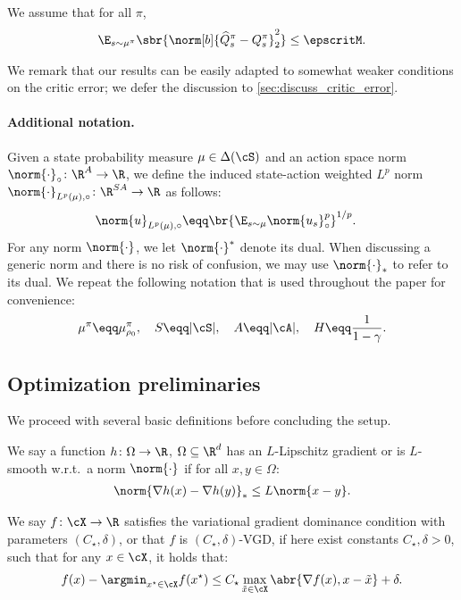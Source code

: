 \begin{assumption}
\label{assm:Q_oracle}
    We assume that for all $\pi$, 
    \begin{align*}
        \E_{s \sim \mu^\pi}\sbr{\norm[b]{\widehat Q_{s}^\pi - Q_{s}^\pi}_2^2} \leq \epscritM.
    \end{align*}
\end{assumption}
    We remark that our results can be easily adapted to 
    somewhat weaker conditions on the critic error; we defer the discussion to \cref{sec:discuss_critic_error}.
    
\paragraph{Additional notation.}
Given a state probability measure $\mu\in \Delta(\cS)$ and an action space norm $\norm{\cdot}_\circ\colon \R^A \to \R$, we define the induced state-action weighted $L^p$ norm $\norm{\cdot}_{L^p(\mu), \circ}\colon \R^{SA}\to \R$ as follows:
\begin{align*}
	\norm{u}_{L^p(\mu), \circ}
	&\eqq \br{\E_{s \sim \mu}\norm{u_s}_\circ^p}^{1/p}.
\end{align*}
For any norm $\norm{\cdot}$, we let $\norm{\cdot}^*$ denote its dual. When discussing a generic norm and there is no risk of confusion, we may use $\norm{\cdot}_*$ to refer to its dual.
We repeat the following notation that is used throughout the paper for convenience:
\begin{align*}
    \mu^\pi \eqq \mu^\pi_{\rho_0}, \quad 
    S \eqq |\cS|, \quad
    A \eqq |\cA|, \quad
    H \eqq \frac{1}{1-\gamma}.
\end{align*}

\subsection{Optimization preliminaries}
We proceed with several basic definitions before concluding the setup.
\begin{definition}\label{def:Lipschitz_gradient}
We say a function $h\colon\Omega \to \R$, $\Omega\subseteq \R^d$ has an $L$-Lipschitz gradient or is $L$-smooth w.r.t.~a norm $\norm{\cdot}$ if for all $x,y\in \Omega$:
\begin{align*}
    \norm{\nabla h(x) - \nabla h(y)}_* \leq L\norm{x - y}.
\end{align*}
\end{definition}

\begin{definition}\label{def:gradient_dominance}
    We say $f\colon \cX \to \R$ satisfies the variational gradient dominance condition with parameters $(C_\star, \delta)$, or that $f$ is $(C_\star, \delta)$-VGD, if
    here exist constants $C_\star, \delta>0$, such that for any $x \in \cX$, it holds that:
    \begin{align*}
        f(x) - \argmin_{x^\star\in \cX}f(x^\star)
        \leq 
        C_\star \max_{\tilde x \in \cX}\abr{\nabla f(x), x - \tilde x} + \delta.
    \end{align*}
\end{definition}

